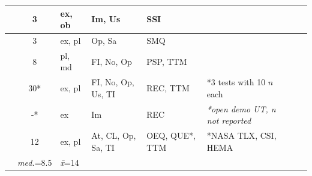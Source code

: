 \documentclass[sigchi, review]{acmart}
\begin{document}
\begin{table}[t]
\begin{tabularx}{\textwidth}{lclllllX}
\cite{xiao2011duet}                  & 3            & ex, ob      & Im, Us                 & SSI                   &   \\ \hline 
\cite{ogata2017keyboard}             & 3            & ex, pl      & Op, Sa                 & SMQ                   &   \\ \hline 
\cite{mcpherson2013space}            & 8            & pl, md      & FI, No, Op             & PSP, TTM              &   \\ \hline 
\cite{mcpherson2011multidimensional} & 30*           & ex, pl      & FI, No, Op, Us, TI     & REC, TTM              & *3 tests with 10 $n$ each  \\ \hline 
\cite{granieri2019reach}             & -*           & ex          & Im                     & REC                   & \textit{*open demo UT, n not reported}  \\ \hline 
\cite{karolus2020hit}                & 12           & ex, pl      & At, CL, Op, Sa, TI     & OEQ, QUE*, TTM                  &  *NASA TLX\cite{hart1988development}, CSI\cite{carroll2009creativity}, HEMA\cite{huta2010pursuing} \\ \midrule 
                                   & \textit{med.}=8.5 & \textit{\={x}}=14   &                   &                       & \\ \bottomrule
\end{tabularx}%
\end{table}
\end{document}
